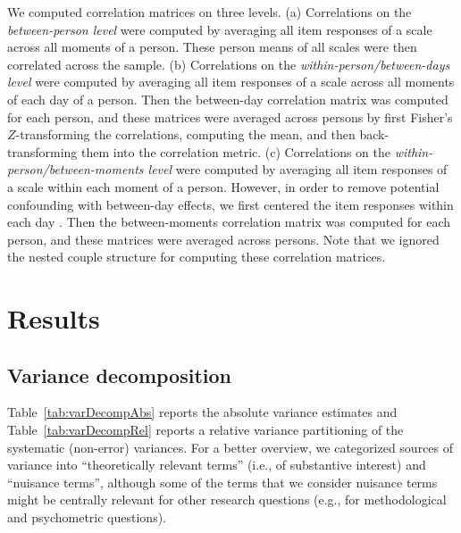 \documentclass[jou,a4paper,draftfirst]{apa6}\usepackage[]{graphicx}\usepackage[]{color}
\begin{document}
We computed correlation matrices on three levels.
(a) Correlations on the \emph{between-person level} were computed by averaging all item responses of a scale across all moments of a person. These person means of all scales were then correlated across the sample. (b) Correlations on the \emph{within-person/between-days level} were computed by averaging all item responses of a scale across all moments of each day of a person. Then the between-day correlation matrix was computed for each person, and these matrices were averaged across persons by first Fisher's $Z$-transforming the correlations, computing the mean, and then back-transforming them into the correlation metric. (c) Correlations on the \emph{within-person/between-moments level} were computed by averaging all item responses of a scale within each moment of a person. However, in order to remove potential confounding with between-day effects, we first centered the item responses within each day \parencite{kreft_IntroducingMultilevelModeling_1998}. Then the between-moments correlation matrix was computed for each person, and these matrices were averaged across persons. 
Note that we ignored the nested couple structure for computing these correlation matrices.


\section{Results}

\subsection{Variance decomposition}
Table~\ref{tab:varDecompAbs} reports the absolute variance estimates and Table~\ref{tab:varDecompRel} reports a relative variance partitioning of the systematic (non-error) variances. For a better overview, we categorized sources of variance into ``theoretically relevant terms'' (i.e., of substantive interest) and ``nuisance terms'', although some of the terms that we consider nuisance terms might be centrally relevant for other research questions (e.g., for methodological and psychometric questions).

\end{document}

